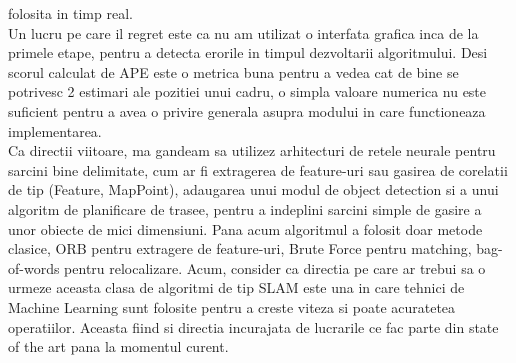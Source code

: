\documentclass[12pt,a4paper]{report}
\begin{document}
folosita in timp real. \\
Un lucru pe care il regret este ca nu am utilizat o interfata grafica inca de la 
primele etape, pentru a detecta erorile in timpul dezvoltarii algoritmului. Desi scorul
calculat de APE este o metrica buna pentru a vedea cat de bine se potrivesc 2 
estimari ale pozitiei unui cadru, o simpla valoare numerica nu este suficient
pentru a avea o privire generala asupra modului in care functioneaza implementarea. \\
Ca directii viitoare, ma gandeam sa utilizez arhitecturi de retele neurale pentru
sarcini bine delimitate, cum ar fi extragerea de feature-uri sau gasirea de corelatii
de tip (Feature, MapPoint), adaugarea unui modul de object detection si a unui 
algoritm de planificare de trasee, pentru a indeplini sarcini simple de gasire 
a unor obiecte de mici dimensiuni. Pana acum algoritmul a folosit doar metode
clasice, ORB pentru extragere de feature-uri, Brute Force pentru 
matching, bag-of-words pentru relocalizare. Acum, consider ca directia pe care ar
trebui sa o urmeze aceasta clasa de algoritmi de tip SLAM este una in care 
tehnici de Machine Learning sunt folosite pentru a creste viteza si poate 
acuratetea operatiilor. Aceasta fiind si directia incurajata de lucrarile ce 
fac parte din state of the art pana la momentul curent.

\printbibliography
 
\end{document}
